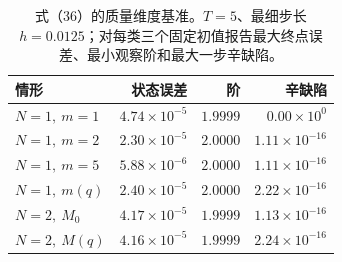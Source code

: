 \begin{table}[t]
\centering\small\setlength{\tabcolsep}{3pt}
\caption{式（36）的质量维度基准。$T=5$、最细步长$h=0.0125$；对每类三个固定初值报告最大终点误差、最小观察阶和最大一步辛缺陷。}
\label{tab:eq36_mass_dimension}
\begin{tabular}{lrrr}
\toprule
情形 & 状态误差 & 阶 & 辛缺陷\\
\midrule
$N=1,\ m=1$ & $4.74\times10^{-5}$ & $1.9999$ & $0.00\times10^{0}$ \\
$N=1,\ m=2$ & $2.30\times10^{-5}$ & $2.0000$ & $1.11\times10^{-16}$ \\
$N=1,\ m=5$ & $5.88\times10^{-6}$ & $2.0000$ & $1.11\times10^{-16}$ \\
$N=1,\ m(q)$ & $2.40\times10^{-5}$ & $2.0000$ & $2.22\times10^{-16}$ \\
$N=2,\ M_0$ & $4.17\times10^{-5}$ & $1.9999$ & $1.13\times10^{-16}$ \\
$N=2,\ M(q)$ & $4.16\times10^{-5}$ & $1.9999$ & $2.24\times10^{-16}$ \\
\bottomrule
\end{tabular}
\end{table}
